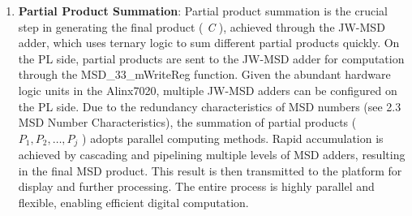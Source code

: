 \documentclass[electronics,article,accept,pdftex,moreauthors]{Definitions/mdpi}
\begin{document}
\begin{enumerate}[label={\arabic*).}]
\item \textbf{Partial Product Summation}: Partial product summation is the crucial step in generating the final product (\textit{ C }), achieved through the JW-MSD adder, which uses ternary logic to sum different partial products quickly. On the PL side, partial products are sent to the JW-MSD adder for computation through the MSD\_33\_mWriteReg function. Given the abundant hardware logic units in the Alinx7020, multiple JW-MSD adders can be configured on the PL side. Due to the redundancy characteristics of MSD numbers (see 2.3 MSD Number Characteristics), the summation of partial products ( $P_1, P_2, \ldots, P_j$ ) adopts parallel computing methods. Rapid accumulation is achieved by cascading and pipelining multiple levels of MSD adders, resulting in the final MSD product. This result is then transmitted to the platform for display and further processing. The entire process is highly parallel and flexible, enabling efficient digital computation. 
\end{enumerate}
\end{document}
